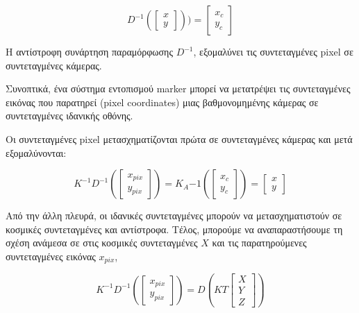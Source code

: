 \begin{equation}
D^{-1}
\left (
\begin{bmatrix}
x\\
y  
\end{bmatrix}
\right )
)=
\begin{bmatrix}
x_{c}\\
y_{c}
\end{bmatrix}
\end{equation} 


Η αντίστροφη συνάρτηση παραμόρφωσης $D^{-1}$, εξομαλύνει τις συντεταγμένες pixel σε συντεταγμένες κάμερας.




Συνοπτικά, ένα σύστημα εντοπισμού marker μπορεί να μετατρέψει τις συντεταγμένες εικόνας που παρατηρεί (pixel coordinates) μιας βαθμονομημένης κάμερας σε συντεταγμένες ιδανικής οθόνης. 


Οι συντεταγμένες pixel μετασχηματίζονται πρώτα σε συντεταγμένες κάμερας και μετά εξομαλύνονται:

\begin{equation}
K^{-1}D^{-1} 
\left (\begin{bmatrix}
x_{pix}\\ 
y_{pix}
\end{bmatrix}  \right )
=K_Α{-1}
\left (\begin{bmatrix}
x_{c}\\ 
y_{c}
\end{bmatrix}  \right )
=
\begin{bmatrix}
x\\ 
y
\end{bmatrix}
\end{equation}

Από την άλλη πλευρά, οι ιδανικές συντεταγμένες μπορούν να μετασχηματιστούν σε κοσμικές συντεταγμένες και αντίστροφα. Τέλος, μπορούμε να αναπαραστήσουμε τη σχέση ανάμεσα σε στις κοσμικές συντεταγμένες $X$ και τις παρατηρούμενες συντεταγμένες εικόνας $x_{pix}$,

\begin{equation}
K^{-1}D^{-1} 
\left (\begin{bmatrix}
x_{pix}\\ 
y_{pix}
\end{bmatrix}  \right )
=D
\left (KT \begin{bmatrix}
X\\ 
Y\\
Z
\end{bmatrix}  \right )
\end{equation}


